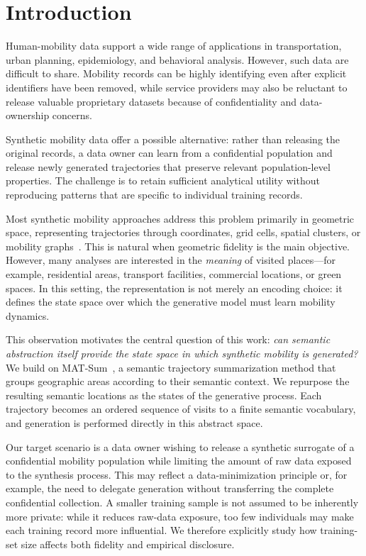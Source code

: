 \documentclass[sigconf,nonacm]{acmart}
\begin{document}
\section{Introduction}
\label{sec:introduction}

Human-mobility data support a wide range of applications in
transportation, urban planning, epidemiology, and behavioral analysis.
However, such data are difficult to share. Mobility records can be
highly identifying even after explicit identifiers have been removed,
while service providers may also be reluctant to release valuable
proprietary datasets because of confidentiality and data-ownership
concerns.

Synthetic mobility data offer a possible alternative: rather than
releasing the original records, a data owner can learn from a
confidential population and release newly generated trajectories that
preserve relevant population-level properties. The challenge is to
retain sufficient analytical utility without reproducing patterns that
are specific to individual training records.

Most synthetic mobility approaches address this problem primarily in
geometric space, representing trajectories through coordinates, grid
cells, spatial clusters, or mobility graphs~\cite{feng2020,gursoy2018}.
This is natural when geometric fidelity is the main objective.
However, many analyses are interested in the \emph{meaning} of visited
places---for example, residential areas, transport facilities,
commercial locations, or green spaces. In this setting, the
representation is not merely an encoding choice: it defines the state
space over which the generative model must learn mobility dynamics.

This observation motivates the central question of this work:
\emph{can semantic abstraction itself provide the state space in which
synthetic mobility is generated?}
We build on MAT-Sum~\cite{pugliese2023}, a semantic trajectory
summarization method that groups geographic areas according to their
semantic context. We repurpose the resulting semantic locations as the
states of the generative process. Each trajectory becomes an ordered
sequence of visits to a finite semantic vocabulary, and generation is
performed directly in this abstract space.

Our target scenario is a data owner wishing to release a synthetic
surrogate of a confidential mobility population while limiting the
amount of raw data exposed to the synthesis process. This may reflect a
data-minimization principle or, for example, the need to delegate
generation without transferring the complete confidential collection.
A smaller training sample is not assumed to be inherently more private:
while it reduces raw-data exposure, too few individuals may make each
training record more influential. We therefore explicitly study how
training-set size affects both fidelity and empirical disclosure.
\end{document}
